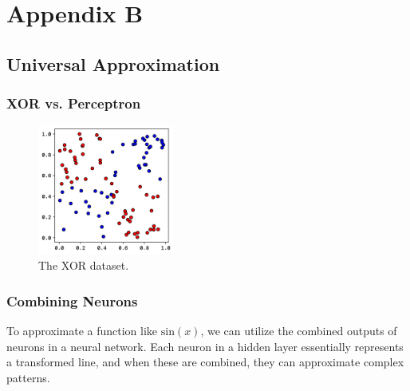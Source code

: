 \documentclass[twoside,11pt]{report}
\begin{document}
\chapter*{Appendix B}
\label{app:appendixB}

\section{Universal Approximation}
\label{sec:UAT}



\subsection*{XOR vs. Perceptron}
\label{app:xor}

\begin{figure}
    \begin{center}
        \includegraphics[width=0.4\textwidth]{../runsAndFigures/xor.png}
    \end{center}
    \caption{The XOR dataset.}\label{fig:xor_data}
\end{figure}



\begin{figure}[h]
\end{figure}

\begin{figure}[!h]
\end{figure}

\subsection*{Combining Neurons}
\label{app:neuronscombined}

To approximate a function like $\text{sin}(x)$, we can utilize the combined outputs of neurons in a neural network. Each neuron in a hidden layer essentially represents a transformed line, and when these are combined, they can approximate complex patterns.
\end{document}
